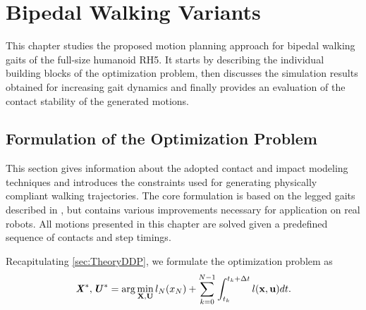 
\chapter{Bipedal Walking Variants}\label{c4}
This chapter studies the proposed motion planning approach for bipedal walking gaits of the full-size humanoid RH5. It starts by describing the individual building blocks of the optimization problem, then discusses the simulation results obtained for increasing gait dynamics and finally provides an evaluation of the contact stability of the generated motions.

\section{Formulation of the Optimization Problem}
This section gives information about the adopted contact and impact modeling techniques and introduces the constraints used for generating physically compliant walking trajectories. The core formulation is based on the legged gaits described in \cite{mastalli20crocoddyl}, but contains various improvements necessary for application on real robots. All motions presented in this chapter are solved given a predefined sequence of contacts and step timings. 

Recapitulating \cref{sec:TheoryDDP}, we formulate the optimization problem as
\begin{equation}
\bm{\mathit{X}}^*,\bm{\mathit{U}}^*= 
\arg\min_{\mathbf{X},\mathbf{U}} l_N(x_N)+\sum_{k=0}^{N-1} \int_{t_k}^{t_k+\Delta t} l(\mathbf{x},\mathbf{u})dt. 
\end{equation}

